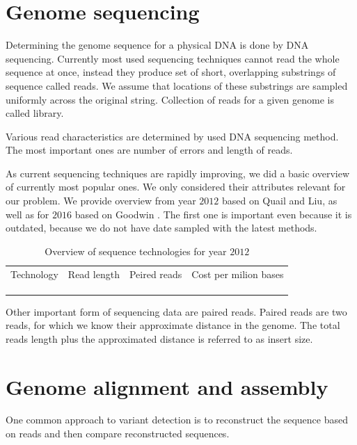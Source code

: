 \section{Genome sequencing}

Determining the genome sequence for a physical DNA is done by DNA sequencing. 
Currently most used sequencing techniques cannot read the whole sequence at once,
instead they produce set of short, overlapping substrings of sequence called reads. 
We assume that locations of these substrings are sampled uniformly across the original string.
Collection of reads for a given genome is called library.

Various read characteristics are determined by used DNA sequencing method. 
The most important ones are number of errors and length of reads.

As current sequencing techniques are rapidly improving, we did a basic overview of currently most popular ones. We only considered their attributes relevant for our problem. 
We provide overview from year $2012$ based on Quail\cite{quail2012tale} and Liu\cite{liu2012comparison}, 
as well as for $2016$ based on Goodwin \cite{goodwin2016coming}. 
The first one is important even because it is outdated, 
because we do not have date sampled with the latest methods.

\begin{table}[h]
\centering
\caption{Overview of sequence technologies for year $2012$}
\label{my-label}
\begin{tabular}{|l||l|l|l|}
Technology & Read length &   Peired reads & Cost per milion bases  \\
 &  &  &  \\
 &  &  &  \\
 &  &  & 
\end{tabular}
\end{table}



Other important form of sequencing data are paired reads. Paired reads are two reads, for which we know their approximate distance in the genome. The total reads length plus the approximated distance is referred to as insert size.


\section{Genome alignment and assembly}
One common approach to variant detection is to reconstruct the sequence based on reads and then compare reconstructed sequences. 

